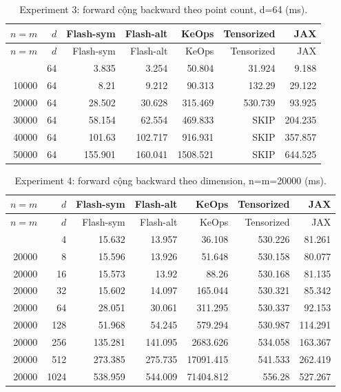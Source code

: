 \documentclass[11pt,a4paper]{article}
\newcommand{\SKIP}{\textnormal{SKIP}}
\begin{document}
\begingroup\small
\begin{longtable}{@{}rrrrrrr@{}}
\caption{Experiment 3: forward cộng backward theo point count, d=64 (ms).}\label{tab:backward-n}\\
\toprule
$n=m$ & $d$ & Flash-sym & Flash-alt & KeOps & Tensorized & JAX \\
\midrule
\endfirsthead
\toprule
$n=m$ & $d$ & Flash-sym & Flash-alt & KeOps & Tensorized & JAX \\
\midrule
\endhead
\bottomrule
\endfoot
5000 & 64 & 3.835 & 3.254 & 50.804 & 31.924 & 9.188 \\
10000 & 64 & 8.21 & 9.212 & 90.313 & 132.29 & 29.122 \\
20000 & 64 & 28.502 & 30.628 & 315.469 & 530.739 & 93.925 \\
30000 & 64 & 58.154 & 62.554 & 469.833 & \SKIP & 204.235 \\
40000 & 64 & 101.63 & 102.717 & 916.931 & \SKIP & 357.857 \\
50000 & 64 & 155.901 & 160.041 & 1508.521 & \SKIP & 644.525 \\
\end{longtable}
\endgroup

\begingroup\small
\begin{longtable}{@{}rrrrrrr@{}}
\caption{Experiment 4: forward cộng backward theo dimension, n=m=20000 (ms).}\label{tab:backward-d}\\
\toprule
$n=m$ & $d$ & Flash-sym & Flash-alt & KeOps & Tensorized & JAX \\
\midrule
\endfirsthead
\toprule
$n=m$ & $d$ & Flash-sym & Flash-alt & KeOps & Tensorized & JAX \\
\midrule
\endhead
\bottomrule
\endfoot
20000 & 4 & 15.632 & 13.957 & 36.108 & 530.226 & 81.261 \\
20000 & 8 & 15.596 & 13.926 & 51.648 & 530.158 & 80.077 \\
20000 & 16 & 15.573 & 13.92 & 88.26 & 530.168 & 81.135 \\
20000 & 32 & 15.602 & 14.097 & 165.044 & 530.321 & 85.342 \\
20000 & 64 & 28.051 & 30.061 & 311.295 & 530.337 & 92.153 \\
20000 & 128 & 51.968 & 54.245 & 579.294 & 530.987 & 114.291 \\
20000 & 256 & 135.281 & 141.095 & 2683.626 & 534.058 & 163.367 \\
20000 & 512 & 273.385 & 275.735 & 17091.415 & 541.533 & 262.419 \\
20000 & 1024 & 538.959 & 544.009 & 71404.812 & 556.28 & 527.267 \\
\end{longtable}
\endgroup
\end{document}
